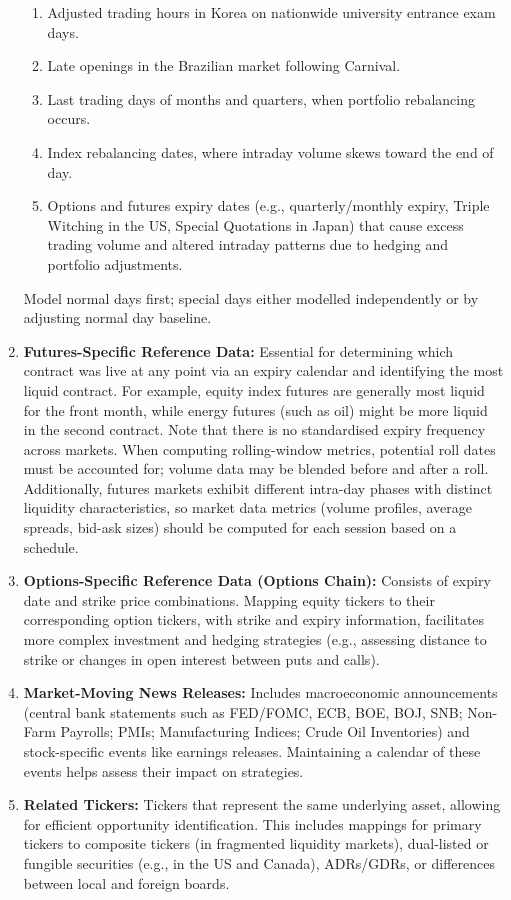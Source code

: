 \begin{definition}
\begin{enumerate}[label=\roman*.]
\begin{enumerate}[label=\arabic*.]
\item Adjusted trading hours in Korea on nationwide university entrance exam days.
\item Late openings in the Brazilian market following Carnival.
\item Last trading days of months and quarters, when portfolio rebalancing occurs.
\item Index rebalancing dates, where intraday volume skews toward the end of day.
\item Options and futures expiry dates (e.g., quarterly/monthly expiry, Triple Witching in the US, Special Quotations in Japan) that cause excess trading volume and altered intraday patterns due to hedging and portfolio adjustments.
\end{enumerate}
Model normal days first; special days either modelled independently or by adjusting normal day baseline.
\item \textbf{Futures-Specific Reference Data:} Essential for determining which contract was live at any point via an expiry calendar and identifying the most liquid contract. For example, equity index futures are generally most liquid for the front month, while energy futures (such as oil) might be more liquid in the second contract. Note that there is no standardised expiry frequency across markets. When computing rolling-window metrics, potential roll dates must be accounted for; volume data may be blended before and after a roll. Additionally, futures markets exhibit different intra-day phases with distinct liquidity characteristics, so market data metrics (volume profiles, average spreads, bid-ask sizes) should be computed for each session based on a schedule.
\item \textbf{Options-Specific Reference Data (Options Chain):} Consists of expiry date and strike price combinations. Mapping equity tickers to their corresponding option tickers, with strike and expiry information, facilitates more complex investment and hedging strategies (e.g., assessing distance to strike or changes in open interest between puts and calls).
\item \textbf{Market-Moving News Releases:} Includes macroeconomic announcements (central bank statements such as FED/FOMC, ECB, BOE, BOJ, SNB; Non-Farm Payrolls; PMIs; Manufacturing Indices; Crude Oil Inventories) and stock-specific events like earnings releases. Maintaining a calendar of these events helps assess their impact on strategies.
\item \textbf{Related Tickers:} Tickers that represent the same underlying asset, allowing for efficient opportunity identification. This includes mappings for primary tickers to composite tickers (in fragmented liquidity markets), dual-listed or fungible securities (e.g., in the US and Canada), ADRs/GDRs, or differences between local and foreign boards.

\end{enumerate}
\end{definition}
